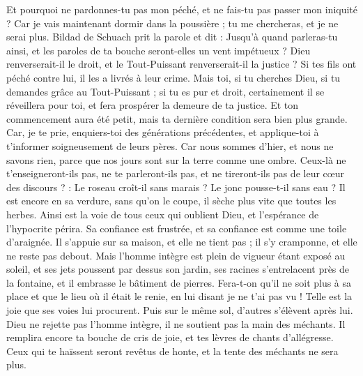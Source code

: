 \begin{multicols}{2}
Et pourquoi ne pardonnes-tu pas mon péché, et ne fais-tu pas passer mon iniquité ? Car je vais maintenant dormir dans la poussière ; tu me chercheras, et je ne serai plus.
\VerseOne{}Bildad de Schuach prit la parole et dit :
Jusqu'à quand parleras-tu ainsi, et les paroles de ta bouche seront-elles un vent impétueux ?
Dieu renverserait-il le droit, et le Tout-Puissant renverserait-il la justice ?
Si tes fils ont péché contre lui, il les a livrés à leur crime.
Mais toi, si tu cherches Dieu, si tu demandes grâce au Tout-Puissant ;
si tu es pur et droit, certainement il se réveillera pour toi, et fera prospérer la demeure de ta justice.
Et ton commencement aura été petit, mais ta dernière condition sera bien plus grande.
Car, je te prie, enquiers-toi des générations précédentes, et applique-toi à t'informer soigneusement de leurs pères.
Car nous sommes d'hier, et nous ne savons rien, parce que nos jours sont sur la terre comme une ombre.
Ceux-là ne t'enseigneront-ils pas, ne te parleront-ils pas, et ne tireront-ils pas de leur cœur des discours ? :
Le roseau croît-il sans marais ? Le jonc pousse-t-il sans eau ?
Il est encore en sa verdure, sans qu'on le coupe, il sèche plus vite que toutes les herbes.
Ainsi est la voie de tous ceux qui oublient Dieu, et l'espérance de l'hypocrite périra.
Sa confiance est frustrée, et sa confiance est comme une toile d'araignée.
Il s'appuie sur sa maison, et elle ne tient pas ; il s'y cramponne, et elle ne reste pas debout.
Mais l'homme intègre est plein de vigueur étant exposé au soleil, et ses jets poussent par dessus son jardin,
ses racines s'entrelacent près de la fontaine, et il embrasse le bâtiment de pierres.
Fera-t-on qu'il ne soit plus à sa place et que le lieu où il était le renie, en lui disant je ne t'ai pas vu ! 
Telle est la joie que ses voies lui procurent. Puis sur le même sol, d'autres s'élèvent après lui.
Dieu ne rejette pas l'homme intègre, il ne soutient pas la main des méchants.
Il remplira encore ta bouche de cris de joie, et tes lèvres de chants d'allégresse.
Ceux qui te haïssent seront revêtus de honte, et la tente des méchants ne sera plus.

\end{multicols}
